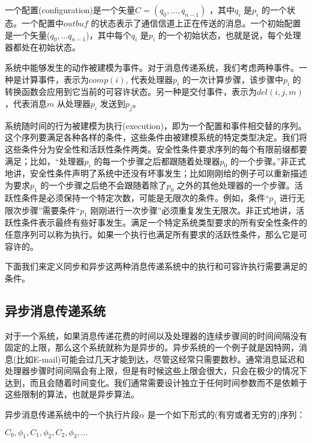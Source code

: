    一个配置(configuration)是一个矢量$C=(q_0,...,q_{n-1})$ ，其中$q_i$ 是$p_i$ 的一个状态。一个配置中$outbuf$ 的状态表示了通信信道上正在传送的消息。一个初始配置是一个矢量($q_0,...q_{n-1}$)，其中每个$q_i$ 是$p_i$ 的一个初始状态，也就是说，每个处理器都处在初始状态。

    系统中能够发生的动作被建模为事件。对于消息传递系统，我们考虑两种事件。一种是计算事件，表示为$comp(i)$, 代表处理器$p_i$ 的一次计算步骤，该步骤中$p_i$ 的转换函数会应用到它当前的可容许状态。另一种是交付事件，表示为$del(i,j,m)$，代表消息$m$ 从处理器$p_i$ 发送到$p_j$。

    系统随时间的行为被建模为执行(execution)，即为一个配置和事件相交替的序列\cite{owicki1976axiomatic}。这个序列要满足各种各样的条件，这些条件由被建模系统的特定类型决定。我们将这些条件分为安全性和活跃性条件两类。安全性条件要求序列的每个有限前缀都要满足；比如，“处理器$p_i$ 的每一个步骤之后都跟随着处理器$p_0$ 的一个步骤。”非正式地讲，安全性条件声明了系统中还没有坏事发生；比如刚刚给的例子可以重新描述为要求$p_1$ 的一个步骤之后绝不会跟随着除了$p_0$ 之外的其他处理器的一个步骤。活跃性条件是必须保持一个特定次数，可能是无限次的条件。例如，条件“$p_1$ 进行无限次步骤”需要条件“$p_1$ 刚刚进行一次步骤”必须重复发生无限次。非正式地讲，活跃性条件表示最终有些好事发生。满足一个特定系统类型要求的所有安全性条件的任意序列可以称为执行。如果一个执行也满足所有要求的活跃性条件，那么它是可容许的\cite{fischer1985impossibility}。

    下面我们来定义同步和异步这两种消息传递系统中的执行和可容许执行需要满足的条件。

    \subsection{异步消息传递系统}
    对于一个系统，如果消息传递花费的时间以及处理器的连续步骤间的时间间隔没有固定的上限，那么这个系统就称为是异步的。异步系统的一个例子就是因特网，消息(比如E-mail)可能会过几天才能到达，尽管这经常只需要数秒。通常消息延迟和处理器步骤时间间隔会有上限，但是有时候这些上限会很大，只会在极少的情况下达到，而且会随着时间变化。我们通常需要设计独立于任何时间参数而不是依赖于这些限制的算法，也就是异步算法。

    异步消息传递系统中的一个执行片段$\alpha$ 是一个如下形式的(有穷或者无穷的)序列：
    \begin{center}
    $C_0,\phi_1,C_1,\phi_2,C_2,\phi_3,...$
    \end{center}

